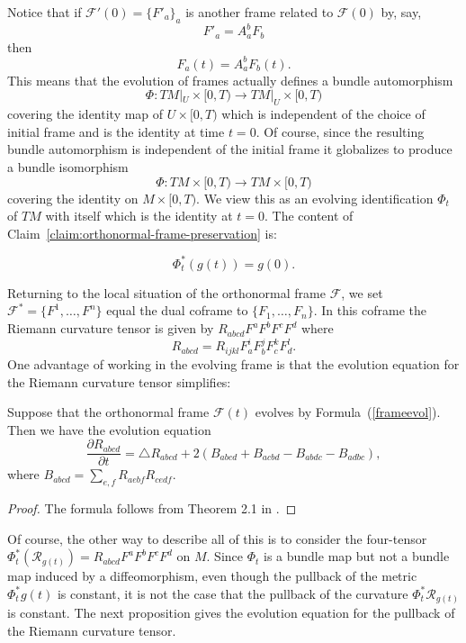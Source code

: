 Notice that if ${\mathcal F}'(0)=\{F'_a\}_a$ is another
frame related to ${\mathcal F}(0)$ by, say,
$$F'_a=A^b_aF_b$$
then $$F_a(t)=A^b_aF_b(t).$$ This means that the evolution of frames
actually defines a bundle automorphism
$$\Phi\colon TM|_U\times [0,T)\to TM|_U\times [0,T)$$
covering the identity map of $U\times[0,T)$ which is independent of
the choice of initial frame and is the identity at time $t=0$. Of
course, since the resulting bundle automorphism is independent of
the initial frame it globalizes to produce a bundle isomorphism
$$\Phi\colon TM\times[0,T)\to TM\times [0,T)$$
covering the identity on $M\times [0,T)$. We view this as an
evolving identification $\Phi_t$ of $TM$ with itself which is the
identity at $t=0$. The content of Claim~\ref{claim:orthonormal-frame-preservation} is:

\begin{corollary}\label{cor:pullback-metric-constant}

$$\Phi_t^*(g(t))=g(0).$$
\end{corollary}

Returning to the local situation of the orthonormal frame ${\mathcal
F}$, we set ${\mathcal F}^*=\{F^1,\ldots, F^n\}$ equal the dual
coframe to $\{F_1,\ldots,F_n\}$. In this coframe the Riemann
curvature tensor is given by $R_{abcd}F^aF^bF^cF^d$ where
\begin{equation}\label{framecoord} R_{abcd} =
R_{ijkl}F^{i}_{a}F^{j}_{b}F^{k}_{c}F^{l}_{d}.\end{equation} One
advantage of working in the evolving frame is that the evolution
equation for the Riemann curvature tensor simplifies:


\begin{lemma}\label{lem:curvature-evolution-frame}
\label{M}

Suppose that the orthonormal frame ${\mathcal F}(t)$  evolves by
Formula~(\ref{frameevol}). Then we have the evolution equation
$$\frac{\partial R_{abcd}}{\partial t} = \triangle R_{abcd} +
2(B_{abcd} +B_{acbd}-B_{abdc}-B_{adbc}),$$ where $B_{abcd} =
\sum_{e,f}R_{aebf}R_{cedf}$.
\end{lemma}


\begin{proof}
\sketch The formula follows from Theorem 2.1 in \cite{Hamiltonharnack}.
\end{proof}

Of course, the other way to describe all of this  is to consider the
four-tensor $\Phi_t^*({\mathcal R}_{g(t)})=R_{abcd}F^aF^bF^cF^d$ on
$M$. Since $\Phi_t$ is a bundle map but not a bundle map induced by
a diffeomorphism, even though the pullback of the metric
$\Phi_t^*g(t)$ is constant, it is not the case that the pullback of
the curvature $\Phi_t^*{\mathcal R}_{g(t)}$ is constant.
 The next proposition gives the evolution equation for the pullback
 of the Riemann curvature tensor.



